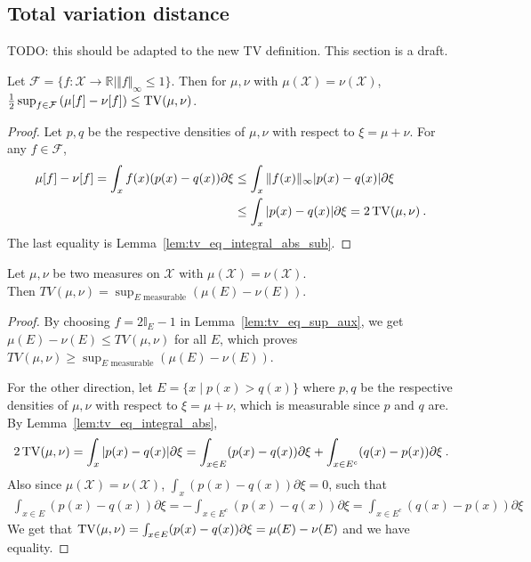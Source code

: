 \subsection{Total variation distance}

TODO: this should be adapted to the new TV definition. This section is a draft.

\begin{lemma}
  \label{lem:tv_eq_sup_aux}
  Let $\mathcal F = \{f : \mathcal X \to \mathbb{R} \mid \Vert f \Vert_\infty \le 1\}$.
  Then for $\mu, \nu $ with $\mu(\mathcal X) = \nu(\mathcal X)$, $\frac{1}{2} \sup_{f \in \mathcal F} \left( \mu[f] - \nu[f] \right) \le \operatorname{TV}(\mu, \nu)$.
\end{lemma}

\begin{proof}
Let $p,q$ be the respective densities of $\mu, \nu$ with respect to $\xi=\mu+\nu$.
For any $f \in \mathcal F$,
\begin{align*}
\mu[f] - \nu[f]
= \int_x f(x)(p(x) - q(x)) \partial\xi
&\le \int_x \Vert f(x) \Vert_\infty \vert p(x) - q(x) \vert \partial\xi
\\
&\le \int_x \vert p(x) - q(x) \vert \partial\xi
= 2 \operatorname{TV}(\mu, \nu)
\: .
\end{align*}
The last equality is Lemma~\ref{lem:tv_eq_integral_abs_sub}.
\end{proof}

\begin{theorem}
  \label{thm:tv_eq_sup_sub_measure}
  Let $\mu, \nu$ be two measures on $\mathcal X$ with $\mu(\mathcal X) = \nu(\mathcal X)$.\\
  Then $TV(\mu, \nu) = \sup_{E \text{ measurable}} \left( \mu(E) - \nu(E) \right)$.
\end{theorem}

\begin{proof}
By choosing $f = 2 \mathbb{I}_E - 1$ in Lemma~\ref{lem:tv_eq_sup_aux}, we get $\mu(E) - \nu(E) \le TV(\mu, \nu)$ for all $E$, which proves
$TV(\mu, \nu) \ge \sup_{E \text{ measurable}} \left( \mu(E) - \nu(E) \right)$.

For the other direction, let $E = \{x \mid p(x) > q(x)\}$ where $p,q$ be the respective densities of $\mu, \nu$ with respect to $\xi=\mu+\nu$, which is measurable since $p$ and $q$ are. By Lemma~\ref{lem:tv_eq_integral_abs},
\begin{align*}
2\operatorname{TV}(\mu, \nu)
= \int_x \vert p(x) - q(x) \vert \partial \xi
= \int_{x \in E} (p(x) - q(x)) \partial \xi + \int_{x \in E^c} (q(x) - p(x)) \partial \xi
\: .
\end{align*}
Also since $\mu(\mathcal X) = \nu(\mathcal X)$, $\int_x (p(x) - q(x)) \partial \xi = 0$, such that
\begin{align*}
\int_{x \in E} (p(x) - q(x)) \partial \xi
= - \int_{x \in E^c} (p(x) - q(x)) \partial \xi
= \int_{x \in E^c} (q(x) - p(x)) \partial \xi
\end{align*}
We get that $\operatorname{TV}(\mu, \nu) = \int_{x \in E} (p(x) - q(x)) \partial \xi = \mu(E) - \nu(E)$ and we have equality.
\end{proof}

